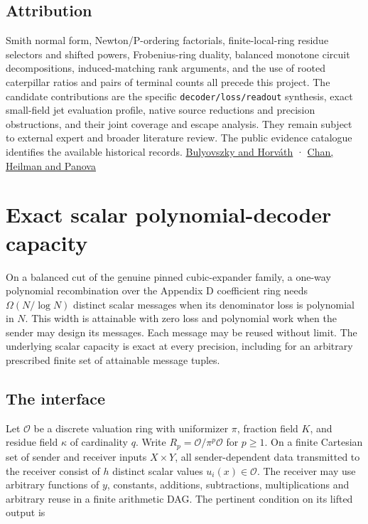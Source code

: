 \documentclass[11pt,a4paper]{article}
\begin{document}
\subsection{Attribution}\label{v8-attribution}

Smith normal form, Newton/P-ordering factorials, finite-local-ring
residue selectors and shifted powers, Frobenius-ring duality, balanced
monotone circuit decompositions, induced-matching rank arguments, and
the use of rooted caterpillar ratios and pairs of terminal counts all
precede this project. The candidate contributions are the specific
\nolinkurl{decoder/loss/readout} synthesis, exact small-field jet
evaluation profile, native source reductions and precision obstructions,
and their joint coverage and escape analysis. They remain subject to
external expert and broader literature review. The public evidence
catalogue identifies the available historical records.
\href{https://doi.org/10.1016/j.tcs.2017.09.002}{Bulyovszky and Horváth}
· \href{https://arxiv.org/html/2604.19094}{Chan, Heilman and Panova}

\section{Exact scalar polynomial-decoder
capacity}\label{v8-section-nonlinear-budget}

On a balanced cut of the genuine pinned cubic-expander family, a one-way
polynomial recombination over the Appendix D coefficient ring needs
\(\Omega(N/\log N)\) distinct scalar messages when its denominator loss
is polynomial in \(N\). This width is attainable with zero loss and
polynomial work when the sender may design its messages. Each message
may be reused without limit. The underlying scalar capacity is exact at
every precision, including for an arbitrary prescribed finite set of
attainable message tuples.

\subsection{The interface}\label{v8-the-interface}

Let \(\mathcal O\) be a discrete valuation ring with uniformizer
\(\pi\), fraction field \(K\), and residue field \(\kappa\) of
cardinality \(q\). Write \(R_p=\mathcal O/\pi^p\mathcal O\) for
\(p\ge1\). On a finite Cartesian set of sender and receiver inputs
\(X\times Y\), all sender-dependent data transmitted to the receiver
consist of \(h\) distinct scalar values \(u_i(x)\in\mathcal O\). The
receiver may use arbitrary functions of \(y\), constants, additions,
subtractions, multiplications and arbitrary reuse in a finite arithmetic
DAG. The pertinent condition on its lifted output is
\end{document}
